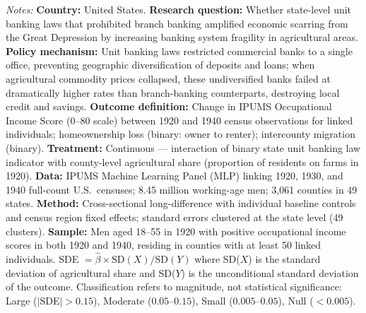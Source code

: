 \begin{table}[H]
\begin{threeparttable}
\begin{tablenotes}[flushleft]
\item \textit{Notes:} \textbf{Country:} United States. \textbf{Research question:} Whether state-level unit banking laws that prohibited branch banking amplified economic scarring from the Great Depression by increasing banking system fragility in agricultural areas. \textbf{Policy mechanism:} Unit banking laws restricted commercial banks to a single office, preventing geographic diversification of deposits and loans; when agricultural commodity prices collapsed, these undiversified banks failed at dramatically higher rates than branch-banking counterparts, destroying local credit and savings. \textbf{Outcome definition:} Change in IPUMS Occupational Income Score (0--80 scale) between 1920 and 1940 census observations for linked individuals; homeownership loss (binary: owner to renter); intercounty migration (binary). \textbf{Treatment:} Continuous --- interaction of binary state unit banking law indicator with county-level agricultural share (proportion of residents on farms in 1920). \textbf{Data:} IPUMS Machine Learning Panel (MLP) linking 1920, 1930, and 1940 full-count U.S.\ censuses; 8.45 million working-age men; 3,061 counties in 49 states. \textbf{Method:} Cross-sectional long-difference with individual baseline controls and census region fixed effects; standard errors clustered at the state level (49 clusters). \textbf{Sample:} Men aged 18--55 in 1920 with positive occupational income scores in both 1920 and 1940, residing in counties with at least 50 linked individuals. SDE $= \hat{\beta} \times \text{SD}(X) / \text{SD}(Y)$ where SD($X$) is the standard deviation of agricultural share and SD($Y$) is the unconditional standard deviation of the outcome. Classification refers to magnitude, not statistical significance: Large ($|$SDE$| > 0.15$), Moderate ($0.05$--$0.15$), Small ($0.005$--$0.05$), Null ($< 0.005$).
\end{tablenotes}
\end{threeparttable}
\end{table}

